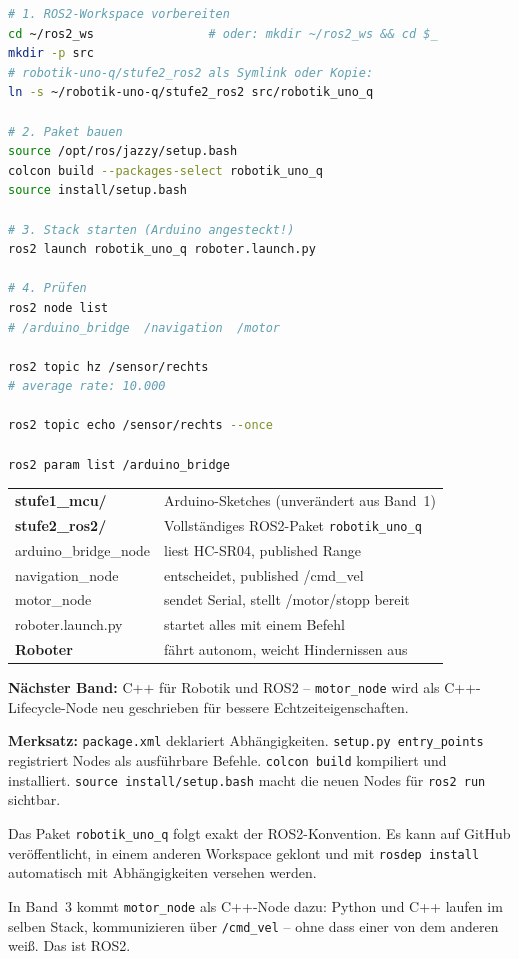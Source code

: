 \begin{loesungBox}
\begin{lstlisting}[language=bash]
# 1. ROS2-Workspace vorbereiten
cd ~/ros2_ws                # oder: mkdir ~/ros2_ws && cd $_
mkdir -p src
# robotik-uno-q/stufe2_ros2 als Symlink oder Kopie:
ln -s ~/robotik-uno-q/stufe2_ros2 src/robotik_uno_q

# 2. Paket bauen
source /opt/ros/jazzy/setup.bash
colcon build --packages-select robotik_uno_q
source install/setup.bash

# 3. Stack starten (Arduino angesteckt!)
ros2 launch robotik_uno_q roboter.launch.py

# 4. Prüfen
ros2 node list
# /arduino_bridge  /navigation  /motor

ros2 topic hz /sensor/rechts
# average rate: 10.000

ros2 topic echo /sensor/rechts --once

ros2 param list /arduino_bridge
\end{lstlisting}
\end{loesungBox}

\begin{projektBox}
\begin{tabular}{ll}
\textbf{stufe1\_mcu/} & Arduino-Sketches (unverändert aus Band~1) \\
\textbf{stufe2\_ros2/} & Vollständiges ROS2-Paket \texttt{robotik\_uno\_q} \\
\quad arduino\_bridge\_node & liest HC-SR04, published Range \\
\quad navigation\_node & entscheidet, published /cmd\_vel \\
\quad motor\_node & sendet Serial, stellt /motor/stopp bereit \\
\quad roboter.launch.py & startet alles mit einem Befehl \\
\textbf{Roboter} & fährt autonom, weicht Hindernissen aus \\
\end{tabular}

\bigskip
\textbf{Nächster Band:} C++ für Robotik und ROS2 -- \texttt{motor\_node}
wird als C++-Lifecycle-Node neu geschrieben für bessere Echtzeiteigenschaften.
\end{projektBox}

\begin{merksatzBox}
\textbf{Merksatz:}
\texttt{package.xml} deklariert Abhängigkeiten.
\texttt{setup.py entry\_points} registriert Nodes als ausführbare Befehle.
\texttt{colcon build} kompiliert und installiert.
\texttt{source install/setup.bash} macht die neuen Nodes für \texttt{ros2 run} sichtbar.
\end{merksatzBox}

\begin{robotikBox}
Das Paket \texttt{robotik\_uno\_q} folgt exakt der ROS2-Konvention.
Es kann auf GitHub veröffentlicht,
in einem anderen Workspace geklont
und mit \texttt{rosdep install} automatisch mit Abhängigkeiten versehen werden.

In Band~3 kommt \texttt{motor\_node} als C++-Node dazu:
Python und C++ laufen im selben Stack,
kommunizieren über \texttt{/cmd\_vel} --
ohne dass einer von dem anderen weiß.
Das ist ROS2.
\end{robotikBox}
